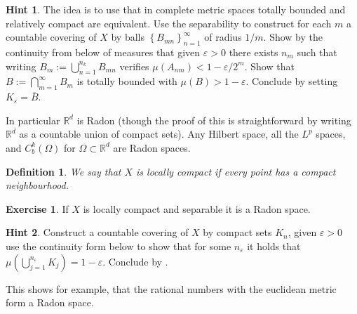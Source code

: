 \documentclass[
    a4paper,
    DIV=14,
    abstract=true,
    numbers=noenddot
]
{scrartcl}
\newtheorem{definition}[definition]{Definition}
\theoremstyle{definition}
\newtheorem{exercise}{Exercise}
\newtheorem*{hint}{Hint}
\newcommand{\eps}{\varepsilon}
\newcommand{\set}[1]{\left\{#1\right\}}
\newcommand{\R}{\mathbb{R}}
\begin{document}
\begin{hint}
    The idea is to use that in complete metric spaces totally bounded and relatively compact are equivalent.
    Use the separability to construct for each $m$ a countable covering of $X$ by balls $\set{B_{mn}}_{n=1}^\infty$ of radius $1/m$. Show by the continuity from below of measures that given $\eps >0$  there exists $n_m$ such that writing $B_m:= \bigcup _{n=1}^{n_k} B_{mn}$ verifies $\mu (A_{nm})<1- \eps /2^m$. Show that $B:=\bigcap_{m=1}^ \infty B_m$ is totally bounded with $\mu (B)> 1-\eps$. Conclude by setting $K_\eps = \overline{B}$.
\end{hint}
In particular $\R^d$ is Radon (though the proof of this is straightforward by writing $\R^d$ as a countable union of compact sets). Any Hilbert space, all the $L^p$ spaces, and $C^k_b(\Omega )$ for $\Omega \subset \R^d$  are Radon spaces.
\begin{definition}
    We say that $X$ is locally compact if every point has a compact neighbourhood.
\end{definition}
\begin{exercise}
    If $X$ is locally compact and separable it is a Radon space.
\end{exercise}
\begin{hint}
    Construct a countable covering of $X$ by compact sets $K_n$, given $\eps >0$ use the continuity form below to show that for some $n_\eps $ it holds that $\mu ( \bigcup_{j=1}^{n_\eps } K_j)= 1-\eps $. Conclude by .
\end{hint}
This shows for example, that the rational numbers with the euclidean metric form a Radon space.
\end{document}
